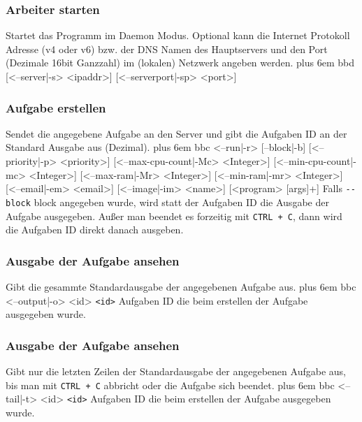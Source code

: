 \documentclass[a4paper,12pt]{article}
\makeatletter
\newenvironment{mycode}
 {\def\@xobeysp{\ }\verbatim\rightskip=0pt plus 6em\relax}
 {\endverbatim}
\makeatother
\begin{document}
\subsubsection{Arbeiter starten}
Startet das Programm im \gls{Daemon} Modus. Optional kann die Internet Protokoll Adresse (v4 oder v6) bzw. der DNS Namen des Hauptservers und den Port (Dezimale 16bit Ganzzahl) im (lokalen) Netzwerk angeben werden.
\begin{mycode}
bbd [<--server|-s> <ipaddr>] [<--serverport|-sp> <port>]
\end{mycode}

\subsubsection{Aufgabe erstellen}
Sendet die angegebene Aufgabe an den Server und gibt die Aufgaben ID an der Standard Ausgabe aus (Dezimal).
\begin{mycode}
bbc <--run|-r> [--block|-b] [<--priority|-p> <priority>] [<--max-cpu-count|-Mc> <Integer>] [<--min-cpu-count|-mc> <Integer>] [<--max-ram|-Mr> <Integer>] [<--min-ram|-mr> <Integer>] [<--email|-em> <email>] [<--image|-im> <name>] [<program> [args]+]
\end{mycode}
Falls \texttt{-{}-block} block angegeben wurde, wird statt der Aufgaben ID die Ausgabe der Aufgabe ausgegeben.
Außer man beendet es forzeitig mit \texttt{CTRL + C}, dann wird die Aufgaben ID direkt danach ausgeben.

\subsubsection{Ausgabe der Aufgabe ansehen}
Gibt die gesammte Standardausgabe der angegebenen Aufgabe aus.
\begin{mycode}
bbc <--output|-o> <id>
\end{mycode}
\texttt{<id>} Aufgaben ID die beim erstellen der Aufgabe ausgegeben wurde.

\subsubsection{Ausgabe der Aufgabe ansehen}
Gibt nur die letzten Zeilen der Standardausgabe der angegebenen Aufgabe aus, bis man mit \texttt{CTRL + C} abbricht oder die Aufgabe sich beendet.
\begin{mycode}
bbc <--tail|-t> <id>
\end{mycode}
\texttt{<id>} Aufgaben ID die beim erstellen der Aufgabe ausgegeben wurde.
\end{document}
